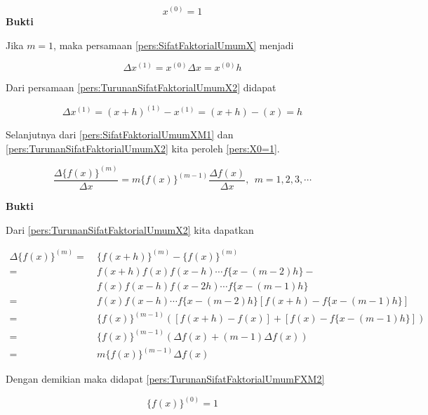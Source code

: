 \begin{equation}\label{pers:X0=1}
\boxed{x^{(0)} = 1}
\end{equation}
\textbf{Bukti}

Jika $m=1$, maka persamaan \ref{pers:SifatFaktorialUmumX} menjadi

\begin{equation}\label{pers:SifatFaktorialUmumXM1}
\Delta x^{(1)} = x^{(0)}\Delta x = x^{(0)}h
\end{equation}

Dari persamaan \ref{pers:TurunanSifatFaktorialUmumX2} didapat

\begin{equation}\label{pers:TurunanSifatFaktorialUmumXM2}
\Delta x^{(1)} = (x+h)^{(1)} - x^{(1)} = (x+h) - (x) = h
\end{equation}

Selanjutnya dari \ref{pers:SifatFaktorialUmumXM1} dan \ref{pers:TurunanSifatFaktorialUmumX2} kita peroleh \ref{pers:X0=1}.


\begin{equation}\label{pers:TurunanSifatFaktorialUmumFXM2}
\boxed{\frac{\Delta\{f(x)\}^{(m)}}{\Delta x} = m\{f(x)\}^{(m-1)}\frac{\Delta f(x)}{\Delta x}}, ~~m=1,2,3,\cdots
\end{equation}

\textbf{Bukti}

Dari \ref{pers:TurunanSifatFaktorialUmumX2} kita dapatkan

\begin{equation*}
\begin{split}
\Delta\{f(x)\}^{(m)} =~& \{f(x+h)\}^{(m)} - \{f(x)\}^{(m)}\\
=~& f(x+h)f(x)f(x-h)\cdots f\{x-(m-2)h\}-\\
&f(x)f(x-h)f(x-2h)\cdots f\{x-(m-1)h\}\\
=~& f(x)f(x-h)\cdots f\{x-(m-2)h\}[f(x+h)-f\{x-(m-1)h\}]\\
=~& \{f(x)\}^{(m-1)}([f(x+h)-f(x)]+[f(x)-f\{x-(m-1)h\}])\\
=~& \{f(x)\}^{(m-1)}(\Delta f(x) + (m-1)\Delta f(x))\\
=~& m\{f(x)\}^{(m-1)} \Delta f(x)
\end{split}
\end{equation*}

Dengan demikian maka didapat \ref{pers:TurunanSifatFaktorialUmumFXM2}

\begin{equation}\label{pers:FaktorialUmum0}
\boxed{\{f(x)\}^{(0)} = 1}
\end{equation}


